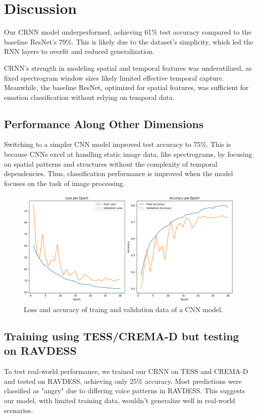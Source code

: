 \documentclass[../main.tex]{subfiles}
\begin{document}
\section{Discussion}

Our CRNN model underperformed, achieving 61\% test accuracy compared to the 
baseline ResNet's 79\%. This is likely due to the dataset's simplicity, which 
led the RNN layers to overfit and reduced generalization.

CRNN's strength in modeling spatial and temporal features was underutilized, as 
fixed spectrogram window sizes likely limited effective temporal capture. 
Meanwhile, the baseline ResNet, optimized for spatial features, was sufficient for 
emotion classification without relying on temporal data.

\subsection{Performance Along Other Dimensions}

Switching to a simpler CNN model improved test accuracy to 75\%. This is because 
CNNs excel at handling static image data, like spectrograms, by focusing on 
spatial patterns and structures without the complexity of temporal dependencies. Thus, 
classification performance is improved when the model focuses on the task of 
image processing.

\begin{figure}[h]
    \centering
    \includegraphics[width=.5\linewidth]{../resources/cnn_mixed.png}
    \caption{Loss and accuracy of traing and validation data of a CNN model.}
    \label{fig:cnn_mixed}
\end{figure}

\subsection{Training using TESS/CREMA-D but testing on RAVDESS}

To test real-world performance, we trained our CRNN on TESS and CREMA-D 
and tested on RAVDESS, achieving only 25\% accuracy. Most predictions were 
classified as "angry" due to differing voice patterns in RAVDESS. This 
suggests our model, with limited training data, wouldn't generalize well 
in real-world scenarios.
\end{document}
